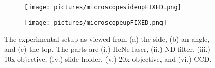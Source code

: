\begin{figure}[ht!]
    \ContinuedFloat
    \begin{center}
        \begin{subfigure}[t]{\textwidth}
            \label{fig:OurMicroscopeSideUp}
            \texttt{[image: pictures/microscopesideupFIXED.png]}
            \caption{}
        \end{subfigure}

    \end{center}
\end{figure}



\begin{figure}[ht!]
    \ContinuedFloat
    \begin{center}

        \begin{subfigure}[t]{\textwidth}
            \label{fig:OurMicroscopeUp}
            \texttt{[image: pictures/microscopeupFIXED.png]}
            \caption{}
        \end{subfigure}

    \end{center}
    \caption{%
        The experimental setup as viewed from (a) the side, (b)
        an angle, and (c) the top. The parts are
            (i.) HeNe laser, (ii.) ND filter, (iii.) 10x objective, (iv.)
                slide holder, (v.) 20x objective, and (vi.) CCD.
    }%
    \label{fig:OurMicroscope}
\end{figure}


